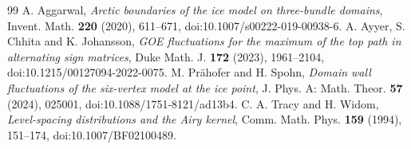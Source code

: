 \documentclass[11pt,a4paper]{amsart}
\newcommand{\href}[2]{#2}
\theoremstyle{remark}\newtheorem{remark}[theorem]{Remark}
\numberwithin{equation}{section}
\begin{document}
\begin{thebibliography}{99}
 A. Aggarwal, \emph{Arctic boundaries of the ice model on three-bundle domains}, Invent. Math. \textbf{220} (2020), 611--671, \href{https://doi.org/10.1007/s00222-019-00938-6}{doi:10.1007/s00222-019-00938-6}.
 A. Ayyer, S. Chhita and K. Johansson, \emph{GOE fluctuations for the maximum of the top path in alternating sign matrices}, Duke Math. J. \textbf{172} (2023), 1961--2104, \href{https://doi.org/10.1215/00127094-2022-0075}{doi:10.1215/00127094-2022-0075}.
 M. Pr\"ahofer and H. Spohn, \emph{Domain wall fluctuations of the six-vertex model at the ice point}, J. Phys. A: Math. Theor. \textbf{57} (2024), 025001, \href{https://doi.org/10.1088/1751-8121/ad13b4}{doi:10.1088/1751-8121/ad13b4}.
 C. A. Tracy and H. Widom, \emph{Level-spacing distributions and the Airy kernel}, Comm. Math. Phys. \textbf{159} (1994), 151--174, \href{https://doi.org/10.1007/BF02100489}{doi:10.1007/BF02100489}.
\end{thebibliography}
\end{document}
